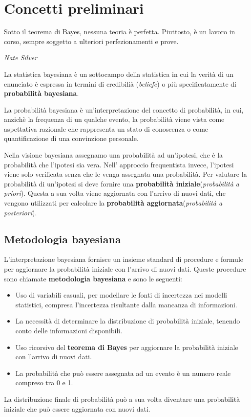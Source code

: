 \documentclass[../main.tex]{subfiles}
\begin{document}
\chapter{Concetti preliminari}
\epigraph{Sotto il teorema di Bayes, nessuna teoria è perfetta. Piuttosto, è un lavoro in corso, sempre soggetto a ulteriori perfezionamenti e prove.}{\textit{Nate Silver}}
\hfill \break
La statistica bayesiana è un sottocampo della statistica in cui la verità di un enunciato è espressa in termini di credibilià (\textit{beliefe})
o più specificatamente di \textbf{probabilità bayesiana}.
\begin{definition}
    La probabilità bayesiana è un'interpretazione del concetto di probabilità, in cui, anzichè la frequenza di un qualche evento, la probabilità
    viene vista come aspettativa razionale che rappresenta un stato di conoscenza o come quantificazione di una convinzione personale.
\end{definition}
\hfill \break
Nella visione bayesiana assegnamo una probabilità ad un'ipotesi, che è la probabilità che l'ipotesi sia vera.
Nell' approccio frequentista invece, l'ipotesi viene solo verificata senza che le venga assegnata una probabilità.
Per valutare la probabilità di un'ipotesi si deve fornire una \textbf{probabilità iniziale}(\textit{probabilità a priori}).
Questa a sua volta viene aggiornata con l'arrivo di nuovi dati, che vengono utilizzati per calcolare la \textbf{probabilità aggiornata}(\textit{probabilità a posteriori}).

\section{Metodologia bayesiana}
L'interpretazione bayesiana fornisce un insieme standard di procedure e formule per aggiornare la probabilità iniziale con l'arrivo di nuovi dati.
Queste procedure sono chiamate \textbf{metodologia bayesiana} e sono le seguenti:
\begin{itemize}
    \item Uso di variabili casuali, per modellare le fonti di incertezza nei modelli statistici, compresa l'incertezza risultante dalla mancanza di informazioni.
    \item La necessità di determinare la distribuzione di probabilità iniziale, tenendo conto delle informazioni disponibili.
    \item Uso ricorsivo del \textbf{teorema di Bayes} per aggiornare la probabilità iniziale con l'arrivo di nuovi dati.
    \item La probabilità che può essere assegnata ad un evento è un numero reale compreso tra 0 e 1.
\end{itemize}
La distribuzione finale di probabilità può a sua volta diventare una probabilità iniziale che può essere aggiornata con nuovi dati.
\end{document}
